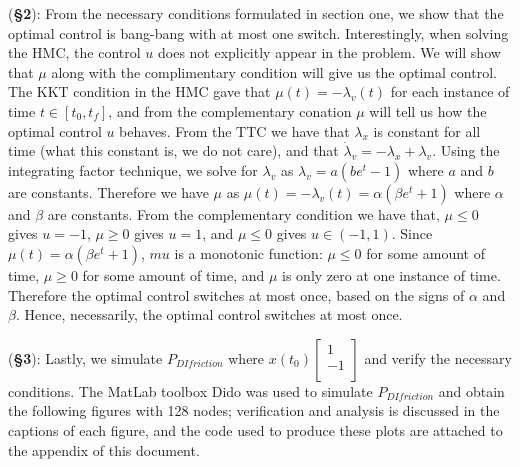 \documentclass[10pt]{article}
\newcommand{\mat}[2][ccccccccccccccc]{\left [\!\!\begin{array}{#1} #2\\ \end{array} \!\!\right]}
\begin{document}
\begin{enumerate}[leftmargin=*]
      (\textbf{\S2}): From the necessary conditions formulated in section one, we show that the optimal control is bang-bang with at most one switch.  Interestingly, when solving the HMC, the control $u$ does not explicitly appear in the problem.  We will show that $\mu$ along with the complimentary condition will give us the optimal control.  The KKT condition in the HMC gave that $\mu(t)=-\lambda_v(t)$ for each instance of time $t\in[t_0,t_f]$, and from the complementary conation $\mu$ will tell us how the optimal control $u$ behaves.  From the TTC we have that $\lambda_x$ is constant for all time (what this constant is, we do not care), and that $\dot\lambda_v = -\lambda_x + \lambda_v$. Using the integrating factor technique, we solve for $\lambda_v$ as $\lambda_v = a(be^t-1)$ where $a$ and $b$ are constants.  Therefore we have $\mu$ as  $\mu(t)=-\lambda_v(t) = \alpha(\beta e^t+1)$ where $\alpha$ and $\beta$ are constants.  From the complementary condition we have that, $\mu\le0$ gives $u=-1$, $\mu\ge0$ gives $u=1$, and $\mu\le0$ gives $u\in(-1,1)$. Since $\mu(t)= \alpha(\beta e^t+1)$, $mu$ is a monotonic function: $\mu\le0$ for some amount of time, $\mu\ge0$ for some amount of time, and $\mu$ is only zero at one instance of time.  Therefore the optimal control switches at most once, based on the signs of $\alpha$ and $\beta$.  Hence, necessarily, the optimal control switches at most once.


      (\textbf{\S3}): Lastly, we simulate $P_{DIfriction}$ where $x(t_0)\mat{1\\-1}$ and verify the necessary conditions.  The MatLab toolbox Dido was used to simulate $P_{DIfriction}$ and obtain the following figures with 128 nodes; verification and analysis is discussed in the captions of each figure, and the code used to produce these plots are attached to the appendix of this document.


\end{enumerate}
\end{document}
